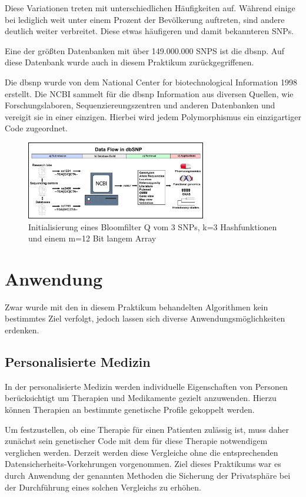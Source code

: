 Diese Variationen treten mit unterschiedlichen Häufigkeiten auf. Während einige bei lediglich weit unter einem Prozent der Bevölkerung auftreten, sind andere deutlich weiter verbreitet. Diese etwas häufigeren und damit bekannteren SNPs.

Eine der größten Datenbanken mit über 149.000.000 SNPS ist die dbsnp.
Auf diese Datenbank wurde auch in diesem Praktikum zurückgegriffenen.
 
Die dbsnp wurde von dem National Center for biotechnological Information  1998 erstellt. Die NCBI sammelt für die dbsnp  Information aus diversen Quellen, wie Forschungslaboren, Sequenziereungszentren  und anderen Datenbanken und vereigit sie in einer einzigen.  Hierbei wird jedem Polymorphismus ein einzigartiger Code zugeordnet.
\begin{figure}[htbp] 
	\centering
	\includegraphics[width=0.7\textwidth]{./Graphics/DbSNP_diagram_no_caption.jpg}
	\caption{Initialisierung eines Bloomfilter Q vom 3 SNPs, k=3 Hashfunktionen und einem m=12 Bit langem Array }
	\label{fig:Bild2}
\end{figure}


\section{Anwendung}

Zwar wurde mit den in diesem Praktikum behandelten Algorithmen kein bestimmtes Ziel verfolgt, jedoch lassen sich diverse Anwendungsmöglichkeiten erdenken. 

\subsection{Personalisierte Medizin}

In der personalisierte Medizin werden individuelle Eigenschaften von Personen berücksichtigt um Therapien und Medikamente gezielt anzuwenden.
Hierzu können Therapien an bestimmte genetische Profile gekoppelt werden.

Um festzustellen, ob eine Therapie für einen Patienten zulässig ist, muss daher zunächst sein genetischer Code mit dem für diese Therapie notwendigem verglichen werden.
Derzeit werden diese Vergleiche ohne die entsprechenden Datensicherheits-Vorkehrungen vorgenommen.
Ziel dieses Praktikums war es durch Anwendung der genannten Methoden die Sicherung der Privatsphäre bei der Durchführung eines solchen Vergleichs zu erhöhen.

